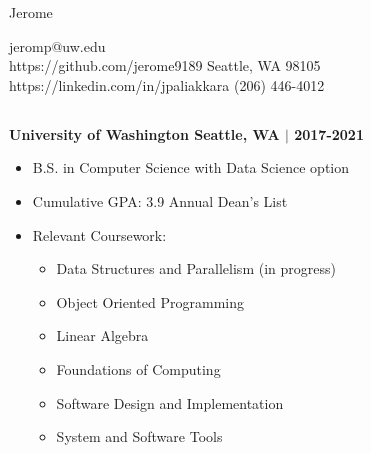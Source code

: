 \documentclass[10pt]{article}
\begin{document}
\begin{center}
    \Huge{Jerome\textbf{ \color{crimson}{Paliakkara}}}
\end{center}
jeromp@uw.edu \hfill \\
https://github.com/jerome9189 \hfill Seattle, WA 98105\\
https://linkedin.com/in/jpaliakkara \hfill (206) 446-4012
\begin{spacing}{0.3}
\section*{\color{crimson}{Education}}
\textbf{University of Washington \hfill Seattle, WA $|$ 2017-2021}
\begin{itemize}
\setlength\itemsep{0.1em}
    \item B.S. in Computer Science with Data Science option
    \item Cumulative GPA: 3.9 \qquad Annual Dean's List
    \item Relevant Coursework:
    \begin{multicols}{2}
    \begin{itemize}
        \item Data Structures and Parallelism (in progress)
        \item Object Oriented Programming
        \item Linear Algebra
        \item Foundations of Computing
        \item Software Design and Implementation
        \item System and Software Tools
    \end{itemize}
    \end{multicols}
\end{itemize}

\end{spacing}
\end{document}
